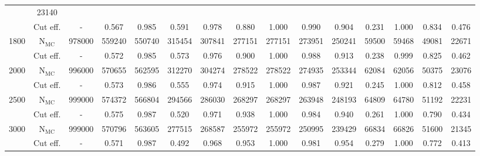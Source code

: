 \begin{table}[H]
{{\begin{tabular*}{250mm}{@{\extracolsep{\fill}}c|cccccccccccccc}
                                    & 23140\\
             & Cut eff.               & -      & 0.567  & 0.985   & 0.591   & 0.978     & 0.880      & 1.000    & 0.990         & 0.904                    & 0.231                     & 1.000                 & 0.834       
                                    & 0.476\\
        \hline
        1800 & $\text{N}_{\text{MC}}$ & 978000 & 559240 & 550740  & 315454  & 307841    & 277151     & 277151   & 273951        & 250241                   & 59500                     & 59468                 & 49081       
                                    & 22671\\
             & Cut eff.               & -      & 0.572  & 0.985   & 0.573   & 0.976     & 0.900      & 1.000    & 0.988         & 0.913                    & 0.238                     & 0.999                 & 0.825       
                                    & 0.462\\
        \hline
        2000 & $\text{N}_{\text{MC}}$ & 996000 & 570655 & 562595  & 312270  & 304274    & 278522     & 278522   & 274935        & 253344                   & 62084                     & 62056                 & 50375       
                                    & 23076\\
             & Cut eff.               & -      & 0.573  & 0.986   & 0.555   & 0.974     & 0.915      & 1.000    & 0.987         & 0.921                    & 0.245                     & 1.000                 & 0.812       
                                    & 0.458\\
        \hline
        2500 & $\text{N}_{\text{MC}}$ & 999000 & 574372 & 566804  & 294566  & 286030    & 268297     & 268297   & 263948        & 248193                   & 64809                     & 64780                 & 51192                                     & 22231\\
             & Cut eff.               & -      & 0.575  & 0.987   & 0.520   & 0.971     & 0.938      & 1.000    & 0.984         & 0.940                    & 0.261                     & 1.000                 & 0.790                                & 0.434\\
        \hline
        3000 & $\text{N}_{\text{MC}}$ & 999000 & 570796 & 563605  & 277515  & 268587    & 255972     & 255972   & 250995        & 239429                   & 66834                     & 66826                 & 51600                                     & 21345\\
             & Cut eff.               & -      & 0.571  & 0.987   & 0.492   & 0.968     & 0.953      & 1.000    & 0.981         & 0.954                    & 0.279                     & 1.000                 & 0.772         
                                    & 0.413\\         
        \hline\hline
    \end{tabular*}
    \label{tab:CutflowForHp}
    }
    }\par
\end{table}

